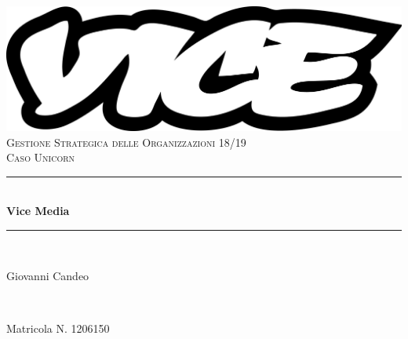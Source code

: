 \documentclass[a4paper, 11pt]{article}
\begin{document}

\begin{titlepage}
	\centering
    \vspace*{0.5 cm}
    \includegraphics[width=0.5 \linewidth]{images/ViceMediaLogo.png}\\[1.0 cm]
    \textsc{\LARGE Gestione Strategica delle Organizzazioni 18/19}\\[2.0 cm]
	\textsc{\Large Caso Unicorn}\\[0.5 cm]				
	\rule{\linewidth}{0.2 mm} \\[0.4 cm]
	{ \huge \bfseries Vice Media}\\
	\rule{\linewidth}{0.2 mm} \\[1.5 cm]
	
	\begin{minipage}{0.4\textwidth}
		\begin{flushleft} \large
			Giovanni Candeo\\
		\end{flushleft}
		\end{minipage}~
		\begin{minipage}{0.4\textwidth}
            
		\begin{flushright} \large
            Matricola N. 1206150\\
		\end{flushright}
        
	\end{minipage}\\[2 cm]
	
	
    
    
    
    
	
\end{titlepage}

\end{document}
